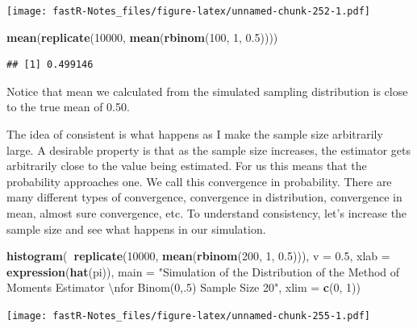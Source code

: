 \documentclass[]{book}
\newenvironment{Shaded}{\begin{snugshade}}{\end{snugshade}}
\newcommand{\KeywordTok}[1]{\textcolor[rgb]{0.13,0.29,0.53}{\textbf{#1}}}
\newcommand{\DataTypeTok}[1]{\textcolor[rgb]{0.13,0.29,0.53}{#1}}
\newcommand{\DecValTok}[1]{\textcolor[rgb]{0.00,0.00,0.81}{#1}}
\newcommand{\FloatTok}[1]{\textcolor[rgb]{0.00,0.00,0.81}{#1}}
\newcommand{\CharTok}[1]{\textcolor[rgb]{0.31,0.60,0.02}{#1}}
\newcommand{\StringTok}[1]{\textcolor[rgb]{0.31,0.60,0.02}{#1}}
\newcommand{\OperatorTok}[1]{\textcolor[rgb]{0.81,0.36,0.00}{\textbf{#1}}}
\newcommand{\NormalTok}[1]{#1}
\theoremstyle{definition}
\theoremstyle{definition}
\theoremstyle{definition}
\theoremstyle{remark}
\begin{document}
\texttt{[image: fastR-Notes\_files/figure-latex/unnamed-chunk-252-1.pdf]}

\begin{Shaded}
\begin{Highlighting}[]
\KeywordTok{mean}\NormalTok{(}\KeywordTok{replicate}\NormalTok{(}\DecValTok{10000}\NormalTok{, }\KeywordTok{mean}\NormalTok{(}\KeywordTok{rbinom}\NormalTok{(}\DecValTok{100}\NormalTok{, }\DecValTok{1}\NormalTok{, }\FloatTok{0.5}\NormalTok{))))}
\end{Highlighting}
\end{Shaded}

\begin{verbatim}
## [1] 0.499146
\end{verbatim}

Notice that mean we calculated from the simulated sampling distribution
is close to the true mean of 0.50.

The idea of consistent is what happens as I make the sample size
arbitrarily large. A desirable property is that as the sample size
increases, the estimator gets arbitrarily close to the value being
estimated. For us this means that the probability approaches one. We
call this convergence in probability. There are many different types of
convergence, convergence in distribution, convergence in mean, almost
sure convergence, etc. To understand consistency, let's increase the
sample size and see what happens in our simulation.

\begin{Shaded}
\begin{Highlighting}[]
\KeywordTok{histogram}\NormalTok{(}\OperatorTok{~}\KeywordTok{replicate}\NormalTok{(}\DecValTok{10000}\NormalTok{, }\KeywordTok{mean}\NormalTok{(}\KeywordTok{rbinom}\NormalTok{(}\DecValTok{200}\NormalTok{, }\DecValTok{1}\NormalTok{, }\FloatTok{0.5}\NormalTok{))), }\DataTypeTok{v =} \FloatTok{0.5}\NormalTok{, }\DataTypeTok{xlab =} \KeywordTok{expression}\NormalTok{(}\KeywordTok{hat}\NormalTok{(pi)), }
    \DataTypeTok{main =} \StringTok{"Simulation of the Distribution of the Method of Moments Estimator }\CharTok{\textbackslash{}n}\StringTok{for Binom(0,.5) Sample Size 20"}\NormalTok{, }
    \DataTypeTok{xlim =} \KeywordTok{c}\NormalTok{(}\DecValTok{0}\NormalTok{, }\DecValTok{1}\NormalTok{))}
\end{Highlighting}
\end{Shaded}

\texttt{[image: fastR-Notes\_files/figure-latex/unnamed-chunk-255-1.pdf]}
\end{document}

